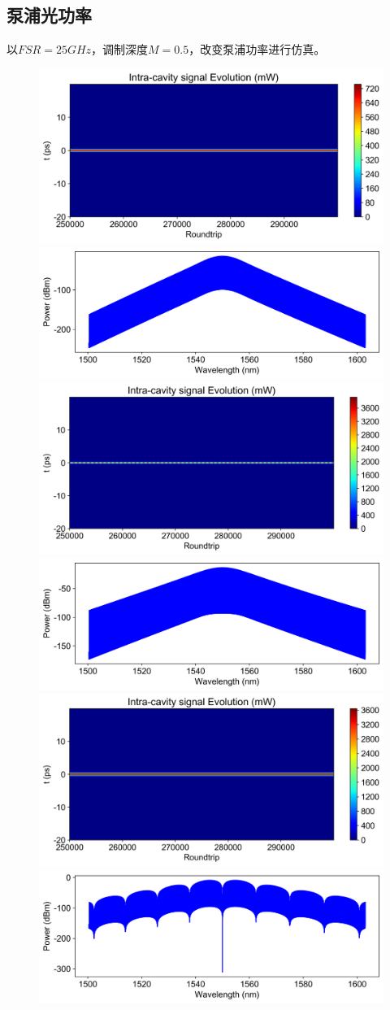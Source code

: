 \subsection{泵浦光功率}
以$FSR = 25GHz$，调制深度$M = 0.5$，改变泵浦功率进行仿真。\\
\begin{figure}[htbp]
    \centering
    \includegraphics[width=0.48\linewidth]{figure/fig_17.png}
    \includegraphics[width=0.48\linewidth]{figure/fig_17_0.png}
    \includegraphics[width=0.48\linewidth]{figure/fig_18.png}
    \includegraphics[width=0.48\linewidth]{figure/fig_18_0.png}
    \includegraphics[width=0.48\linewidth]{figure/fig_19.png}
    \includegraphics[width=0.48\linewidth]{figure/fig_19_0.png}

\end{figure}
